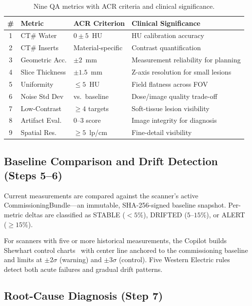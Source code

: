 \documentclass[11pt]{article}
\begin{document}
\begin{table}[t]
\centering
\caption{Nine QA metrics with ACR criteria and clinical significance.}
\label{tab:metrics}
\small
\begin{tabular}{@{}clp{1.8cm}p{4.5cm}@{}}
\toprule
\# & Metric & ACR Criterion & Clinical Significance \\
\midrule
1 & CT\# Water     & $0 \pm 5$~HU      & HU calibration accuracy \\
2 & CT\# Inserts   & Material-specific  & Contrast quantification \\
3 & Geometric Acc. & $\pm 2$~mm         & Measurement reliability for planning \\
4 & Slice Thickness & $\pm 1.5$~mm      & Z-axis resolution for small lesions \\
5 & Uniformity     & $\leq 5$~HU        & Field flatness across FOV \\
6 & Noise Std Dev  & vs.\ baseline      & Dose/image quality trade-off \\
7 & Low-Contrast   & $\geq 4$ targets   & Soft-tissue lesion visibility \\
8 & Artifact Eval. & 0--3 score         & Image integrity for diagnosis \\
9 & Spatial Res.   & $\geq 5$~lp/cm     & Fine-detail visibility \\
\bottomrule
\end{tabular}
\end{table}

\subsection{Baseline Comparison and Drift Detection (Steps 5--6)}

Current measurements are compared against the scanner's active
CommissioningBundle---an immutable, SHA-256-signed baseline
snapshot.
Per-metric deltas are classified as STABLE ($< 5\%$), DRIFTED
($5$--$15\%$), or ALERT ($\geq 15\%$).

For scanners with five or more historical measurements, the Copilot
builds Shewhart control charts~\cite{shewhart1931} with center line
anchored to the commissioning baseline and limits at $\pm 2\sigma$
(warning) and $\pm 3\sigma$ (control).
Five Western Electric rules~\cite{western_electric_1956} detect both
acute failures and gradual drift patterns.

\subsection{Root-Cause Diagnosis (Step 7)}
\end{document}
